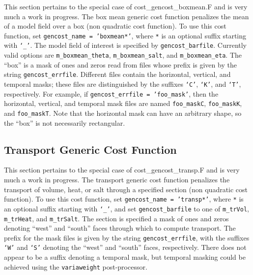 This section pertains to the special case of cost\_gencost\_boxmean.F and is very much a work in progress. The box mean generic cost function penalizes the mean of a model field over a box (non quadratic cost function). To use this cost function, set \texttt{gencost\_name = 'boxmean*'}, where \texttt{*} is an optional suffix starting with \texttt{`\_'}. The model field of interest is specified by \texttt{gencost\_barfile}. Currently valid options are \texttt{m\_boxmean\_theta}, \texttt{m\_boxmean\_salt}, and \texttt{m\_boxmean\_eta}. The ``box'' is a mask of ones and zeros read from files whose prefix is given by the string \texttt{gencost\_errfile}. Different files contain the horizontal, vertical, and temporal masks; these files are distinguished by the suffixes \texttt{`C'}, \texttt{`K'}, and \texttt{`T'}, respectively. For example, if \texttt{gencost\_errfile = 'foo\_mask'}, then the horizontal, vertical, and temporal mask files are named \texttt{foo\_maskC}, \texttt{foo\_maskK}, and \texttt{foo\_maskT}. Note that the horizontal mask can have an arbitrary shape, so the ``box'' is not necessarily rectangular.

\subsection{Transport Generic Cost Function} \label{gentrsp}

This section pertains to the special case of cost\_gencost\_transp.F and is very much a work in progress. The transport generic cost function penalizes the transport of volume, heat, or salt through a specified section (non quadratic cost function). To use this cost function, set \texttt{gencost\_name = 'transp*'}, where \texttt{*} is an optional suffix starting with \texttt{`\_'}, and set \texttt{gencost\_barfile} to one of \texttt{m\_trVol}, \texttt{m\_trHeat}, and \texttt{m\_trSalt}. The section is specified a mask of ones and zeros denoting ``west'' and ``south'' faces through which to compute transport. The prefix for the mask files is given by the string \texttt{gencost\_errfile}, with the suffixes \texttt{`W'} and \texttt{`S'} denoting the ``west'' and ``south'' faces, respectively. There does not appear to be a suffix denoting a temporal mask, but temporal masking could be achieved using the \texttt{variaweight} post-processor.

